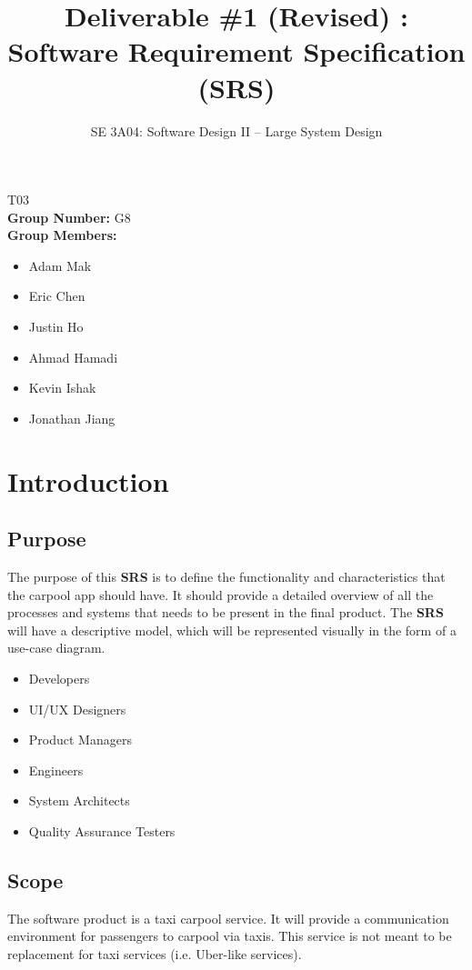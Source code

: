 \documentclass[]{article}
\title{Deliverable \#1 (Revised) : Software Requirement Specification (\textbf{SRS})}
\author{SE 3A04: Software Design II -- Large System Design}
\date{}
\begin{document}
\maketitle\begin{center}
 T03\\
{\bf Group Number:} G8 \\
{\bf Group Members:} 
\begin{itemize} \centering
	\item Adam Mak
	\item Eric Chen
	\item Justin Ho
	\item Ahmad Hamadi
	\item Kevin Ishak
	\item Jonathan Jiang
\end{itemize}
\end{center}

\newpage
\section{Introduction}
\label{sec:introduction}

\subsection{Purpose}
\label{sub:purpose}
The purpose of this \textbf{SRS} is to define the functionality and characteristics that the carpool app should have. It should provide a detailed overview of all the processes and systems that needs to be present in the final product. The \textbf{SRS} will have a descriptive model, which will be represented visually in the form of a use-case diagram.
\begin{itemize}
	\item Developers
	\item UI/UX Designers
	\item Product Managers
	\item Engineers
	\item System Architects
	\item Quality Assurance Testers
\end{itemize}

\subsection{Scope}
\label{sub:scope}
The software product is a taxi carpool service. It will provide a communication environment for passengers to carpool via taxis. This service is not meant to be replacement for taxi services (i.e. Uber-like services).
\end{document}
